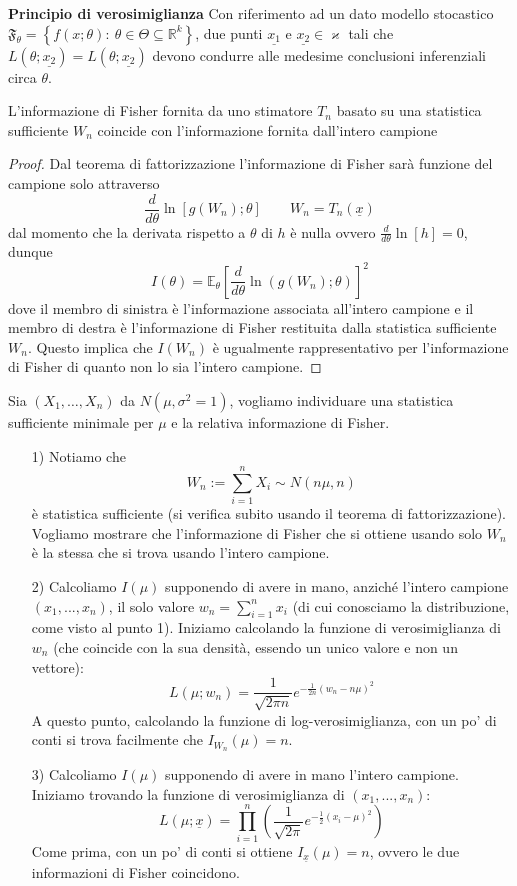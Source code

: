 \noindent\textbf{Principio di verosimiglianza} Con riferimento ad un dato modello stocastico $\mathfrak{F}_\theta=\left\{f(x;\theta):\ \theta\in\Theta\subseteq\mathbb{R}^k\right\}$, due punti $\underline{x_1}$ e $\underline{x_2}\in\varkappa$ tali che $L(\theta;\underline{x_2})=L(\theta;\underline{x_2})$ devono condurre alle medesime conclusioni inferenziali circa $\theta$.

\begin{teo}
L'informazione di Fisher fornita da uno stimatore $T_n$ basato su una statistica sufficiente $W_n$ coincide con l'informazione fornita dall'intero campione

\begin{proof}
Dal teorema di fattorizzazione l'informazione di Fisher sarà funzione del campione solo attraverso
$$\frac{d}{d\theta}\ln\left[g(W_n);\theta\right]\qquad W_n=T_n(\underline{x})$$
dal momento che la derivata rispetto a $\theta$ di $h$ è nulla ovvero $\frac{d}{d\theta}\ln\left[h\right]=0$, dunque
$$I(\theta)=\mathbb{E}_\theta\left[\frac{d}{d\theta}\ln(g(W_n);\theta)\right]^2$$
dove il membro di sinistra è l'informazione associata all'intero campione e il membro di destra è l'informazione di Fisher restituita dalla statistica sufficiente $W_n$.
Questo implica che $I(W_n)$ è ugualmente rappresentativo per l'informazione di Fisher di quanto non lo sia l'intero campione.
\end{proof}
\end{teo}



\begin{esempio} Sia $(X_1,\ldots,X_n)$ da $N(\mu,\sigma^2=1)$, vogliamo individuare una statistica sufficiente minimale per $\mu$ e la relativa informazione di Fisher.
\begin{enumerate}
\item[1)] Notiamo che 
$$W_n:=\sum_{i=1}^n X_i \sim N(n\mu,n)$$
è statistica sufficiente (si verifica subito usando il teorema di fattorizzazione).\\
Vogliamo mostrare che l'informazione di Fisher che si ottiene usando solo $W_n$ è la stessa che si trova usando l'intero campione.
\item[2)] Calcoliamo $I(\mu)$ supponendo di avere in mano, anziché l'intero campione $(x_1,...,x_n)$, il solo valore $w_n=\sum_{i=1}^n x_i$ (di cui conosciamo la distribuzione, come visto al punto 1). Iniziamo calcolando la funzione di verosimiglianza di $w_n$ (che coincide con la sua densità, essendo un unico valore e non un vettore):
$$L(\mu; w_n)=\frac{1}{\sqrt{2 \pi n}} e^{-\frac{1}{2n} (w_n-n\mu)^2}$$
A questo punto, calcolando la funzione di log-verosimiglianza, con un po' di conti si trova facilmente che $I_{W_n}(\mu)=n$.
\item[3)] Calcoliamo $I(\mu)$ supponendo di avere in mano l'intero campione. Iniziamo trovando la funzione di verosimiglianza di $(x_1,...,x_n)$:
$$L(\mu; \underline{x})= \prod_{i=1}^n \left( \frac{1}{\sqrt{2 \pi}} e^{-\frac{1}{2}(x_i-\mu)^2} \right)$$
Come prima, con un po' di conti si ottiene $I_{\underline{x}}(\mu)=n$, ovvero le due informazioni di Fisher coincidono.
\\
\\
\end{enumerate}
\end{esempio}